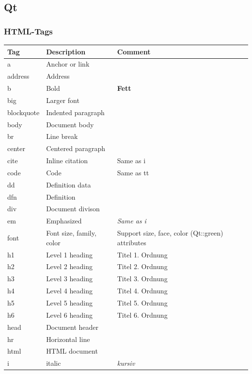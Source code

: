 \subsection{Qt}
\subsubsection{HTML-Tags}

\begin{longtable}{| p{} | p{} | p{}|}
	\hline \textbf{Tag} & \textbf{Description} & \textbf{Comment}\\
	\hline a& Anchor or link& \\
	\hline address & Address &\\
	\hline b& Bold & \textbf{Fett}\\
	\hline big & Larger font&\\
	\hline blockquote & Indented paragraph&\\
	\hline body & Document body &\\
	\hline br & Line break &\\
	\hline center & Centered paragraph&\\
	\hline cite & Inline citation & Same as i\\
	\hline code & Code& Same as tt\\
	\hline dd & Definition data & \\
	\hline dfn & Definition & \\
	\hline div& Document divison&\\
	\hline em& Emphasized& \emph{Same as i}\\
	\hline font& Font size, family, color& Support size, face, color (Qt::green) attributes\\
	\hline h1 & Level 1 heading& Titel 1. Ordnung\\
	\hline h2 & Level 2 heading& Titel 2. Ordnung\\
	\hline h3 & Level 3 heading& Titel 3. Ordnung\\
	\hline h4 & Level 4 heading& Titel 4. Ordnung\\
	\hline h5 & Level 5 heading& Titel 5. Ordnung\\
	\hline h6 & Level 6 heading& Titel 6. Ordnung\\
	\hline head & Document header&\\
	\hline hr & Horizontal line&\\
	\hline html & HTML document&\\
	\hline i & italic& \textit{kursiv}\\

\end{longtable}
